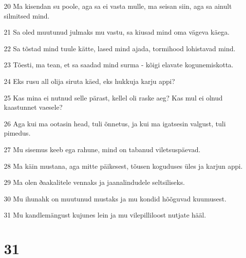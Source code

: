 \par 20 Ma kisendan su poole, aga sa ei vasta mulle, ma seisan siin, aga sa ainult silmitsed mind.
\par 21 Sa oled muutunud julmaks mu vastu, sa kiusad mind oma vägeva käega.
\par 22 Sa tõstad mind tuule kätte, lased mind ajada, tormihood lohistavad mind.
\par 23 Tõesti, ma tean, et sa saadad mind surma - kõigi elavate kogunemiskotta.
\par 24 Eks rusu all olija siruta käed, eks hukkuja karju appi?
\par 25 Kas mina ei nutnud selle pärast, kellel oli raske aeg? Kas mul ei olnud kaastunnet vaesele?
\par 26 Aga kui ma ootasin head, tuli õnnetus, ja kui ma igatsesin valgust, tuli pimedus.
\par 27 Mu sisemus keeb ega rahune, mind on tabanud viletsuspäevad.
\par 28 Ma käin mustana, aga mitte päikesest, tõusen koguduses üles ja karjun appi.
\par 29 Ma olen ðaakalitele vennaks ja jaanalindudele seltsiliseks.
\par 30 Mu ihunahk on muutunud mustaks ja mu kondid hõõguvad kuumusest.
\par 31 Mu kandlemängust kujunes lein ja mu vilepilliloost nutjate hääl.

\chapter{31}

